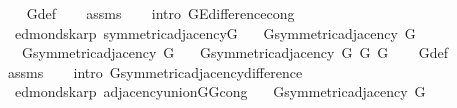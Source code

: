 \begin{isabellebody}
%
\isadelimproof
\ \ %
\endisadelimproof
%
\isatagproof
{}\isamarkupfalse%
\ G{}{\isacharunderscore}{\kern0pt}def\isanewline
\ \ \isamarkupfalse%
\ assms\isanewline
\ \ \isamarkupfalse%
\ {\isacharparenleft}{\kern0pt}intro\ G{\isachardot}{\kern0pt}E{\isacharunderscore}{\kern0pt}difference{\isacharunderscore}{\kern0pt}cong{\isacharparenright}{\kern0pt}%
\endisatagproof
{\isafoldproof}%
%
\isadelimproof
\isanewline
%
\endisadelimproof
%
\isadeliminvisible
\isanewline
%
\endisadeliminvisible
%
\isataginvisible
{}\isamarkupfalse%
\ {\isacharparenleft}{\kern0pt}\ edmonds{\isacharunderscore}{\kern0pt}karp{\isacharparenright}{\kern0pt}\ symmetric{\isacharunderscore}{\kern0pt}adjacency{\isacharunderscore}{\kern0pt}G{}{\isacharcolon}{\kern0pt}\isanewline
\ \ \ {\isachardoublequoteopen}G{\isachardot}{\kern0pt}symmetric{\isacharunderscore}{\kern0pt}adjacency{\isacharprime}{\kern0pt}\ G{\isachardoublequoteclose}\isanewline
\ \ \ {\isachardoublequoteopen}G{\isachardot}{\kern0pt}symmetric{\isacharunderscore}{\kern0pt}adjacency{\isacharprime}{\kern0pt}\ G{\isacharprime}{\kern0pt}{\isachardoublequoteclose}\isanewline
\ \ \ {\isachardoublequoteopen}G{\isachardot}{\kern0pt}symmetric{\isacharunderscore}{\kern0pt}adjacency{\isacharprime}{\kern0pt}\ {\isacharparenleft}{\kern0pt}G{}\ G\ G{\isacharprime}{\kern0pt}{\isacharparenright}{\kern0pt}{\isachardoublequoteclose}%
\endisataginvisible
{\isafoldinvisible}%
%
\isadeliminvisible
\isanewline
%
\endisadeliminvisible
%
\isadelimproof
\ \ %
\endisadelimproof
%
\isatagproof
{}\isamarkupfalse%
\ G{}{\isacharunderscore}{\kern0pt}def\isanewline
\ \ \isamarkupfalse%
\ assms\isanewline
\ \ \isamarkupfalse%
\ {\isacharparenleft}{\kern0pt}intro\ G{\isachardot}{\kern0pt}symmetric{\isacharunderscore}{\kern0pt}adjacency{\isacharunderscore}{\kern0pt}difference{\isacharparenright}{\kern0pt}%
\endisatagproof
{\isafoldproof}%
%
\isadelimproof
\isanewline
%
\endisadelimproof
%
\isadeliminvisible
\isanewline
%
\endisadeliminvisible
%
\isataginvisible
{}\isamarkupfalse%
\ {\isacharparenleft}{\kern0pt}\ edmonds{\isacharunderscore}{\kern0pt}karp{\isacharparenright}{\kern0pt}\ adjacency{\isacharunderscore}{\kern0pt}union{\isacharunderscore}{\kern0pt}G{}{\isacharunderscore}{\kern0pt}G{}{\isacharunderscore}{\kern0pt}cong{\isacharcolon}{\kern0pt}\isanewline
\ \ \ {\isachardoublequoteopen}G{\isachardot}{\kern0pt}symmetric{\isacharunderscore}{\kern0pt}adjacency{\isacharprime}{\kern0pt}\ G{\isachardoublequoteclose}\isanewline

\end{isabellebody}
